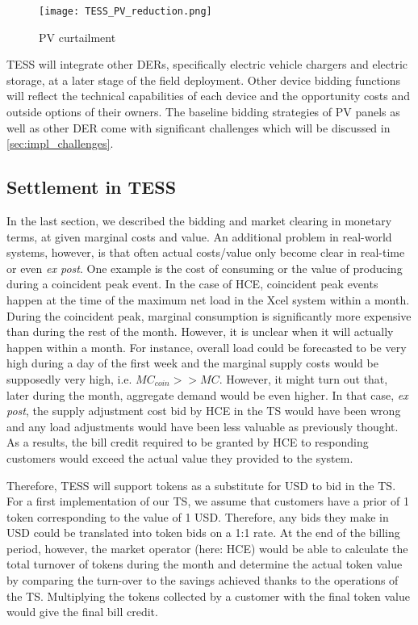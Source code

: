 \begin{figure}
\centering
\texttt{[image: TESS\_PV\_reduction.png]}
\caption{PV curtailment}
\label{fig:pv_profile}
\end{figure}

TESS will integrate other DERs, specifically electric vehicle chargers and electric storage, at a later stage of the field deployment. Other device bidding functions will reflect the technical capabilities of each device and the opportunity costs and outside options of their owners. The baseline bidding strategies of PV panels as well as other DER come with significant challenges which will be discussed in \cref{sec:impl_challenges}.

\subsection{Settlement in TESS}\label{sec:hce_settlement}

In the last section, we described the bidding and market clearing in monetary terms, at given marginal costs and value. An additional problem in real-world systems, however, is that often actual costs/value only become clear in real-time or even  \textit{ex post}. One example is the cost of consuming or the value of producing during a coincident peak event. In the case of HCE, coincident  peak events happen at the time of the maximum net load in the Xcel system within a month. During the coincident peak, marginal consumption is significantly more expensive than during the rest of the month. However, it is unclear when it will actually happen within a month. For instance, overall load could be forecasted to be very high during a day of the first week and the marginal supply costs would be supposedly very high, i.e. $MC_{coin} >> MC$. However, it might turn out that, later during the month, aggregate demand would be even higher. In that case, \textit{ex post}, the supply adjustment cost bid by HCE in the TS would have been wrong and any load adjustments would have been less valuable as previously thought. As a results, the bill credit required to be granted by HCE to responding customers would exceed the actual value they provided to the system.

Therefore, TESS will support tokens as a substitute for USD to bid in the TS. For a first implementation of our TS, we assume that customers have a prior of 1 token corresponding to the value of 1 USD. Therefore, any bids they make in USD could be translated into token bids on a 1:1 rate. 
At the end of the billing period, however, the market operator (here: HCE) would be able to calculate the total turnover of tokens during the month and determine the actual token value by comparing the turn-over to the savings achieved thanks to the operations of the TS. Multiplying the tokens collected by a customer with the final token value would give the final bill credit.

